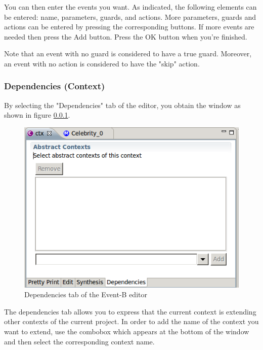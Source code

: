 You can then enter the events you want. As indicated, the following elements can be entered: name, parameters, guards, and actions. More parameters, guards and actions can be entered by pressing the corresponding buttons. If more events are needed then press the \textsf{Add} button. Press the \textsf{OK} button when you’re finished.

Note that an event with no guard is considered to have a true guard. Moreover, an event with no action is considered to have the "skip" action. 

\subsubsection{Dependencies (Context)}

By selecting the "Dependencies" tab of the editor, you obtain the window as shown in figure \ref{}.

\begin{figure}[!h]
\begin{center}
	\includegraphics{img/reference/ref_01_eventb_editor8.png}
	\caption{Dependencies tab of the Event-B editor}
	\label{fig_ref_01_eventb_editor8}
\end{center}
\end{figure}

The dependencies tab allows you to express that the current context is extending other contexts of the current project. In order to add the name of the context you want to extend, use the combobox which appears at the bottom of the window and then select the corresponding context name.


